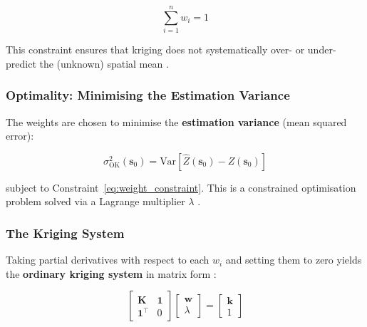 \begin{equation}
    \sum_{i=1}^{n} w_i = 1
    \label{eq:weight_constraint}
\end{equation}

\noindent This constraint ensures that kriging does not systematically
over- or under-predict the (unknown) spatial mean
\cite{cressie1993, hofstra2008comparison}.

\subsubsection{Optimality: Minimising the Estimation Variance}

The weights are chosen to minimise the \textbf{estimation variance}
(mean squared error):

\begin{equation}
    \sigma^2_{\text{OK}}(\mathbf{s}_0)
    = \text{Var}\!\left[\hat{Z}(\mathbf{s}_0) - Z(\mathbf{s}_0)\right]
    \label{eq:kriging_variance_def}
\end{equation}

\noindent subject to Constraint~\eqref{eq:weight_constraint}.
This is a constrained optimisation problem solved via a Lagrange multiplier
$\lambda$ \cite{cressie1993, webster2007geostatistics}.

\subsubsection{The Kriging System}

Taking partial derivatives with respect to each $w_i$ and setting them to
zero yields the \textbf{ordinary kriging system} in matrix form
\cite{cressie1993, webster2007geostatistics, deutsch1998gslib}:

\begin{equation}
    \begin{bmatrix}
        \mathbf{K} & \mathbf{1} \\
        \mathbf{1}^\top & 0
    \end{bmatrix}
    \begin{bmatrix}
        \mathbf{w} \\ \lambda
    \end{bmatrix}
    =
    \begin{bmatrix}
        \mathbf{k} \\ 1
    \end{bmatrix}
    \label{eq:kriging_system}
\end{equation}

